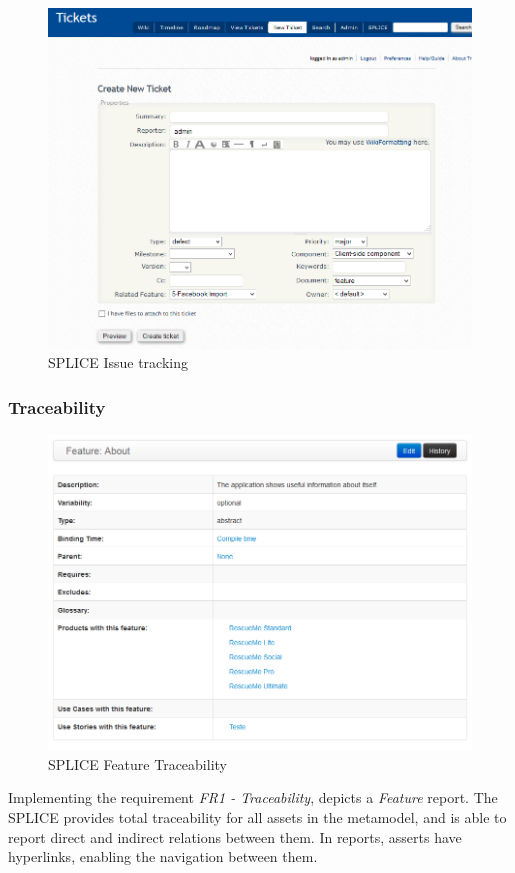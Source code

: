 \begin{figure}[htp]
\begin{center}
  \includegraphics[width=14cm]{chapters/proposed_solution/img/captures/Ticket.PNG}
  \caption[SPLICE Issue tracking]{SPLICE Issue tracking }
  \label{fg:splice-issue-tracking}
\end{center}
\end{figure}

\subsubsection{Traceability}
\begin{figure}[htp]
\begin{center}
 \includegraphics[width=16cm]{chapters/proposed_solution/img/captures/Feature_Deatail.png}
  \caption[SPLICE Feature Traceability]{SPLICE Feature Traceability}
  \label{fg:splice-traceability}
\end{center}
\end{figure}
Implementing the requirement \textit{FR1 - Traceability},  depicts a \textit{Feature} report. The \ac{SPLICE} provides total traceability for all assets in the metamodel, and is able to report direct and indirect relations between them. In reports, asserts have hyperlinks, enabling the navigation between them.

